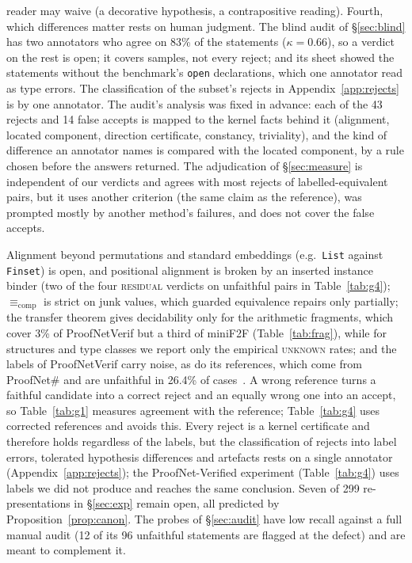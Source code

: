 \documentclass[10pt]{article}
\theoremstyle{definition}
\newcommand{\Ecomp}{\mathrel{\equiv_{\mathrm{comp}}}}
\newcommand{\V}[1]{\textsc{#1}}
\begin{document}
reader may waive (a decorative hypothesis, a contrapositive reading). Fourth, which differences
matter rests on human judgment. The blind audit of \S\ref{sec:blind} has two annotators who agree
on 83\% of the statements ($\kappa=0.66$), so a verdict on the rest is open; it covers samples,
not every reject; and its sheet showed the statements without the benchmark's \texttt{open}
declarations, which one annotator read as type errors. The classification of the subset's rejects in
Appendix~\ref{app:rejects} is by one annotator. The audit's analysis was fixed in advance: each of
the 43 rejects and 14 false accepts is mapped to the kernel facts behind it (alignment, located
component, direction certificate, constancy, triviality), and the kind of difference an
annotator names is compared with the located component, by a rule chosen before the answers
returned. The
adjudication of \S\ref{sec:measure} is independent of our verdicts and agrees with most rejects
of labelled-equivalent pairs, but it uses another criterion (the same claim as the reference),
was prompted mostly by another method's failures, and does not cover the false accepts.

Alignment beyond permutations and standard embeddings (e.g.\ \texttt{List} against
\texttt{Finset}) is open, and positional alignment is broken by an inserted instance binder
(two of the four \V{residual} verdicts on unfaithful pairs in Table~\ref{tab:g4}); $\Ecomp$ is strict on junk values,
which guarded equivalence repairs only partially; the transfer theorem gives decidability
only for the arithmetic fragments, which cover 3\% of ProofNetVerif but a third of
miniF2F (Table~\ref{tab:frag}), while for structures and type classes we report only the
empirical \V{unknown} rates; and the labels of ProofNetVerif carry noise, as do its
references, which come from ProofNet\# and are unfaithful in 26.4\% of cases~\cite{pnv}.
A wrong reference turns a faithful candidate into a correct reject and an equally wrong one into
an accept, so Table~\ref{tab:g1} measures agreement with the reference; Table~\ref{tab:g4} uses
corrected references and avoids this. Every reject is a
kernel certificate and therefore holds regardless of the labels, but the classification of
rejects into label errors, tolerated hypothesis differences and artefacts rests on a single
annotator (Appendix~\ref{app:rejects}); the ProofNet-Verified experiment (Table~\ref{tab:g4})
uses labels we did not produce and reaches the same conclusion. Seven of 299 re-presentations in
\S\ref{sec:exp} remain open, all predicted by Proposition~\ref{prop:canon}. The probes of
\S\ref{sec:audit} have low recall against a full manual audit (12 of its 96 unfaithful
statements are flagged at the defect) and are meant to complement it.
\end{document}
